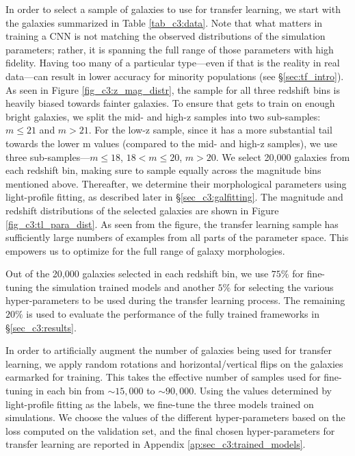 In order to select a sample of galaxies to use for transfer learning, we start with the galaxies summarized in Table \ref{tab_c3:data}. Note that what matters in training a CNN is not matching the observed distributions of the simulation parameters; rather, it is spanning the full range of those parameters with high fidelity. Having too many of a particular type---even if that is the reality in real data---can result in lower accuracy for minority populations (see \S \ref{sec:tf_intro}). As seen in Figure \ref{fig_c3:z_mag_distr}, the sample for all three redshift bins is heavily biased towards fainter galaxies. To ensure that \gampen{} gets to train on enough bright galaxies, we split the mid- and high-z samples into two sub-samples: $m \leq 21$ and $m > 21$. For the low-z sample, since it has a more substantial tail towards the lower m values (compared to the mid- and high-z samples), we use  three sub-samples---$m \leq 18$, $18 < m \leq 20$, $m > 20$. We select 20,000 galaxies from each redshift bin, making sure to sample equally across the magnitude bins mentioned above. Thereafter, we determine their morphological parameters using light-profile fitting, as described later in \S \ref{sec_c3:galfitting}. The magnitude and redshift distributions of the selected galaxies are shown in Figure \ref{fig_c3:tl_para_dist}. As seen from the figure, the transfer learning sample has sufficiently large numbers of examples from all parts of the parameter space. This empowers us to optimize \gampen{} for the full range of galaxy morphologies.

Out of the 20,000 galaxies selected in each redshift bin, we use $75\%$ for fine-tuning the simulation trained \gampen{} models and another $5\%$ for selecting the various hyper-parameters to be used during the transfer learning process. The remaining $20\%$ is used to evaluate the performance of the fully trained \gampen{} frameworks in \S \ref{sec_c3:results}.

In order to artificially augment the number of galaxies being used for transfer learning, we apply random rotations and horizontal/vertical flips on the galaxies earmarked for training. This takes the effective number of samples used for fine-tuning in each bin from $\sim15,000$ to $\sim90,000$. Using the values determined by light-profile fitting as the labels, we fine-tune the three \gampen{} models trained on simulations. We choose the values of the different hyper-parameters based on the loss computed on the validation set, and the final chosen hyper-parameters for transfer learning are reported in Appendix \ref{ap:sec_c3:trained_models}. 
    
